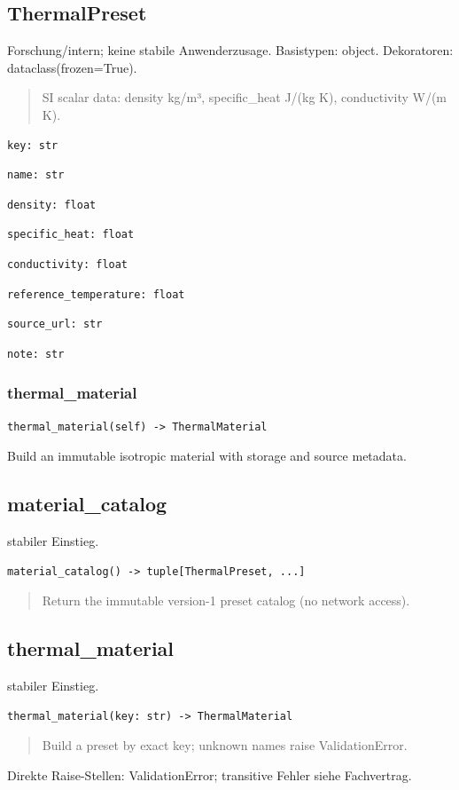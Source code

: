 \subsection{ThermalPreset}
Forschung/intern; keine stabile Anwenderzusage.
Basistypen: object. Dekoratoren: dataclass(frozen=True).
\begin{quote}
SI scalar data: density kg/m³, specific\_heat J/(kg K), conductivity W/(m K).
\end{quote}
\begin{lstlisting}
key: str
\end{lstlisting}
\begin{lstlisting}
name: str
\end{lstlisting}
\begin{lstlisting}
density: float
\end{lstlisting}
\begin{lstlisting}
specific_heat: float
\end{lstlisting}
\begin{lstlisting}
conductivity: float
\end{lstlisting}
\begin{lstlisting}
reference_temperature: float
\end{lstlisting}
\begin{lstlisting}
source_url: str
\end{lstlisting}
\begin{lstlisting}
note: str
\end{lstlisting}
\subsubsection*{thermal\_material}
\begin{lstlisting}
thermal_material(self) -> ThermalMaterial
\end{lstlisting}
Build an immutable isotropic material with storage and source metadata.
\subsection{material\_catalog}
stabiler Einstieg.
\begin{lstlisting}
material_catalog() -> tuple[ThermalPreset, ...]
\end{lstlisting}
\begin{quote}
Return the immutable version-1 preset catalog (no network access).
\end{quote}
\subsection{thermal\_material}
stabiler Einstieg.
\begin{lstlisting}
thermal_material(key: str) -> ThermalMaterial
\end{lstlisting}
\begin{quote}
Build a preset by exact key; unknown names raise ValidationError.
\end{quote}
Direkte Raise-Stellen: ValidationError; transitive Fehler siehe Fachvertrag.
